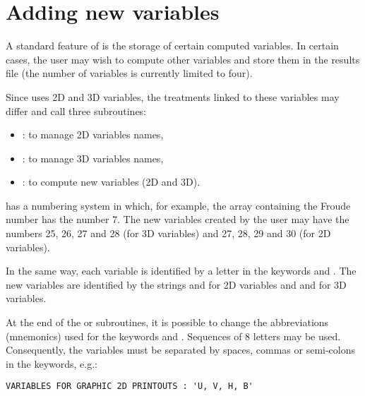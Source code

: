 \section{Adding new variables}
\label{sec:privarray}
A standard feature of  is the storage of certain computed variables.
In certain cases, the user may wish to compute other variables and store them
in the results file (the number of variables is currently limited to four).

Since  uses 2D and 3D variables, the treatments linked to these
variables may differ and call three subroutines:

\begin{itemize}
\item  {}: to manage 2D variables names,

\item  {}: to manage 3D variables names,

\item  {}: to compute new variables (2D and 3D).
\end{itemize}

 has a numbering system in which, for example, the array containing
the Froude number has the number 7. The new variables created by the user may
have the numbers 25, 26, 27 and 28 (for 3D variables) and 27, 28, 29 and 30
(for 2D variables).

In the same way, each variable is identified by a letter in the keywords
 and
.
The new variables are identified by the strings 
and  for 2D variables and  and 
for 3D variables.

At the end of the  or 
subroutines, it is
possible to change the abbreviations (mnemonics) used for the keywords
 and . Sequences of 8 letters may be used.
Consequently, the variables must be separated by spaces, commas or semi-colons
in the keywords, e.g.:

\begin{lstlisting}[language=TelemacCas]
VARIABLES FOR GRAPHIC 2D PRINTOUTS : 'U, V, H, B'
\end{lstlisting}

